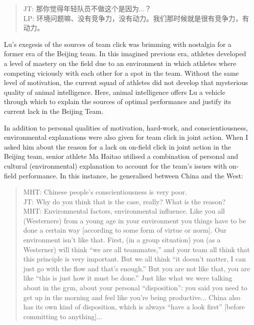 \begin{CJK}{UTF8}{gbsn}
\begin{quote}
      JT: 那你觉得年轻队员不做这个是因为...？\\
      LP: 环境问题嘛、没有竞争力，没有动力。我们那时候就是很有竞争力，有动力。
\end{quote}

Lu's exegesis of the sources of team click was brimming with nostalgia for a former era of the Beijing team.  In this imagined previous era,  athletes developed a level of mastery on the field due to an environment in which athletes where competing viciously with each other for a spot in the team.  Without the same level of motivation, the current squad of athletes did not develop that mysterious quality of animal intelligence.  Here, animal intelligence offers Lu a vehicle through which to explain the sources of optimal performance and justify its current lack in the Beijing Team.

In addition to personal qualities of motivation, hard-work, and conscientiousness, environmental explanations were also given for team click in joint action.  When I asked him about the reason for a lack on on-field click in joint action in the Beijing team, senior athlete Ma Haitao utilised a combination of personal and cultural (environmental) explanation to account for the team's issues with on-field performance.  In this instance, he generalised between China and the West:

\begin{quote}
  MHT: Chinese people's conscientiousness is very poor.\\
  JT: Why do you think that is the case, really? What is the reason? \\ MHT: Environmental factors, environmental influence.  Like you all (Westerners) from a young age in your environment you things have to be done a certain way [according to some form of virtue or norm].  Our environment isn’t like that.  First, (in a group situation) you (as a Westerner) will think ``we are all teammates,'' and your team all think that this principle is very important.  But we all think ``it doesn’t matter, I can just go with the flow and that’s enough.''  But you are not like that, you are like ``this is just how it must be done.'' Just like what we were talking about in the gym, about your personal ``disposition'': you said you need to get up in the morning and feel like you're being productive... China also has its own kind of disposition, which is always ``have a look first'' [before committing to anything]...
\end{quote}


\end{CJK}
